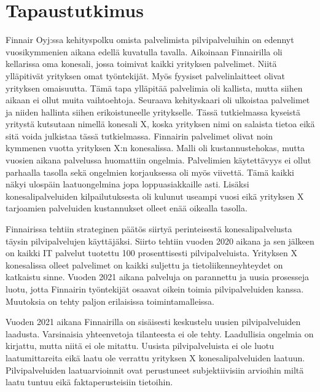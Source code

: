 \chapter{Tapaustutkimus\label{tapautustutkimus}}
Finnair Oyj:ssa kehityspolku omista palvelimista pilvipalveluihin on edennyt vuosikymmenien aikana edellä kuvatulla tavalla. Aikoinaan Finnairilla oli kellarissa oma konesali, jossa toimivat kaikki yrityksen palvelimet. Niitä ylläpitivät yrityksen omat työntekijät. Myös fyysiset palvelinlaitteet olivat yrityksen omaisuutta. Tämä tapa ylläpitää palvelimia oli kallista, mutta siihen aikaan ei ollut muita vaihtoehtoja. Seuraava kehityskaari oli ulkoistaa palvelimet ja niiden hallinta siihen erikoistuneelle yritykselle. Tässä tutkielmassa kyseistä yritystä kutsutaan nimellä konesali X, koska yrityksen nimi on salaista tietoa eikä sitä voida julkistaa tässä tutkielmassa. Finnairin palvelimet olivat noin kymmenen vuotta yrityksen X:n konesalissa. Malli oli kustannustehokas, mutta vuosien aikana palvelussa huomattiin ongelmia. Palvelimien käytettävyys ei ollut parhaalla tasolla sekä ongelmien korjauksessa oli myös viivettä. Tämä kaikki näkyi ulospäin laatuongelmina jopa loppuasiakkaille asti. Lisäksi konesalipalveluiden kilpailutuksesta oli kulunut useampi vuosi eikä yrityksen X tarjoamien palveluiden kustannukset olleet enää oikealla tasolla.

Finnairissa tehtiin strateginen päätös siirtyä perinteisestä konesalipalvelusta täysin pilvipalvelujen käyttäjäksi. Siirto tehtiin vuoden 2020 aikana ja sen jälkeen on kaikki IT palvelut tuotettu 100 prosenttisesti pilvipalveluista. Yrityksen X konesalissa olleet palvelimet on kaikki suljettu ja tietoliikenneyhteydet on katkaistu sinne. Vuoden 2021 aikana palveluja on parannettu ja uusia prosesseja luotu, jotta Finnairin työntekijät osaavat oikein toimia pilvipalveluiden kanssa. Muutoksia on tehty paljon erilaisissa toimintamalleissa.

Vuoden 2021 aikana Finnairilla on sisäisesti keskustelu uusien pilvipalveluiden laadusta. Varsinaisia yhteenvetoja tilanteesta ei ole tehty. Laadullisia ongelmia on kirjattu, mutta niitä ei ole mitattu. Uusista pilvipalveluista ei ole luotu laatumittareita eikä laatu ole verrattu yrityksen X konesalipalveluiden laatuun. Pilvipalveluiden laatuarvioinnit ovat perustuneet subjektiivisiin arvioihin miltä laatu tuntuu eikä faktaperusteisiin tietoihin. 
